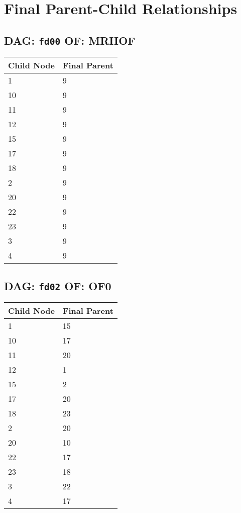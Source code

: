 \documentclass{article}
\begin{document}
\pagestyle{fancy}
\fancyhf{}
\section*{Final Parent-Child Relationships}
\subsection*{DAG: \texttt{fd00} OF: MRHOF}
\begin{tabular}{ll}
\toprule
\textbf{Child Node} & \textbf{Final Parent} \\
\midrule
1 & 9 \\
10 & 9 \\
11 & 9 \\
12 & 9 \\
15 & 9 \\
17 & 9 \\
18 & 9 \\
2 & 9 \\
20 & 9 \\
22 & 9 \\
23 & 9 \\
3 & 9 \\
4 & 9 \\
\bottomrule
\end{tabular}

\subsection*{DAG: \texttt{fd02} OF: OF0}
\begin{tabular}{ll}
\toprule
\textbf{Child Node} & \textbf{Final Parent} \\
\midrule
1 & 15 \\
10 & 17 \\
11 & 20 \\
12 & 1 \\
15 & 2 \\
17 & 20 \\
18 & 23 \\
2 & 20 \\
20 & 10 \\
22 & 17 \\
23 & 18 \\
3 & 22 \\
4 & 17 \\
\bottomrule
\end{tabular}
\end{document}
